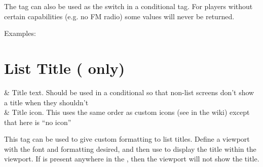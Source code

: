 The tag can also be used as the switch in a conditional tag. For players without
certain capabilities (e.g. no FM radio) some values will never be returned.

Examples:



\section{List Title ( only)}
  \begin{tagmap}
     & Title text. Should be used in a conditional so that non-list
      screens don't show a title when they shouldn't\\
     & Title icon. This uses the same order as custom icons (see
       in the wiki) except that here  is ``no
      icon''\\
  \end{tagmap}

  This tag can be used to give custom formatting to list titles.
  Define a viewport with the font and formatting desired, and then use
   to display the title within the
  viewport.  If  is present anywhere in the , then the
   viewport will not show the title.

